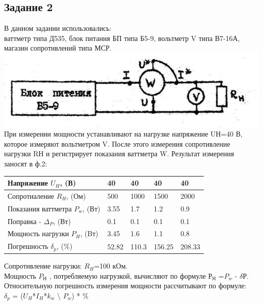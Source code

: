 
\newpage
\subsection*{Задание 2}
	В данном задании использовались:\\
ваттметр типа Д535, блок питания БП типа Б5-9, вольтметр V типа В7-16А, магазин сопротивлений типа МСР.\\
\includegraphics[width=\textwidth]{Part2.png}\\
	При измерении мощности устанавливают на нагрузке напряжение UН=40 В, которое измеряют вольтметром V. После этого измерения сопротивление нагрузки RН и регистрирует показания ваттметра W. Результат измерения заносят в ф.2:\\

	\begin{table} [h!]
 	 \begin{tabular}{|p{6cm}|p{2cm}|p{2cm}|p{2cm}|p{2cm}|}
 	\hline
 	Напряжение $U_{H}$, (В) & 40 & 40 & 40 & 40 \\
 	\hline
 	Сопротиаление $R_{H}$, (Ом) & 500 & 1000 & 1500 & 2000 \\
 	\hline
 	Показания ваттметра $P_{w}$, (Вт) & 3.55 & 1.7 & 1.2 & 0.9 \\
 	\hline
 	Поправка - $\Delta _{P}$, (Вт) & 0.1 & 0.1 & 0.1 & 0.1 \\
 	\hline
 	Мощность нагрузки $P_{H}$, (Bт) & 3.45 & 1.6 & 1.1 & 0.8 \\
 	\hline
 	Погрешность $\delta _{p}$, (\%) & 52.82 & 110.3 & 156.25 & 208.33 \\
 	\hline
 	\end{tabular}
 	\vspace{1cm}
 	Сопротивление нагрузки: $R_{H}$=100 кОм.\\
 	Мощность $P_{Н}$ , потребляемую нагрузкой, вычисляют по формуле $Р_{Н}$ =$P_{w}$ - $\delta$Р.\\
 	Относительную погрешность измерения мощности рассчитывают по формуле:\\
 	$\delta _{p}$ = ($U_{H}$*$I_{H}$*$k_{w}$ $\setminus$ $P_{w}$) * \%
\end{table}
